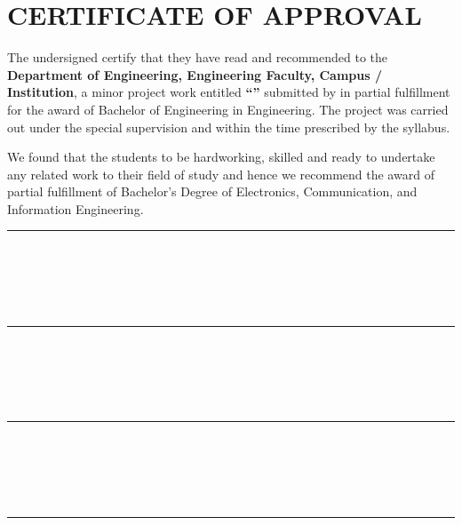 \chapter*{CERTIFICATE OF APPROVAL}
{}

\noindent The undersigned certify that they have read and recommended to the
\textbf{Department of Engineering, Engineering Faculty, Campus / Institution},
a minor project work entitled \textbf{``\cTitle''} submitted by
\textbf{\authorList} in partial fulfillment for the award of Bachelor of
Engineering in Engineering.
The project was carried out under the special supervision and within the time
prescribed by the syllabus.

\vspace{1em}

We found that the students to be hardworking, skilled and ready to undertake
any related work to their field of study and hence we recommend the award of
partial fulfillment of Bachelor's Degree of Electronics, Communication, and
Information Engineering.

\vspace{2em}

\noindent
\begin{minipage}[t]{0.48\textwidth}
    \rule{6cm}{0.2mm} \\
    \cSupervisorTitle \\
    \cSupervisor \\
    \cSupervisorDept \\
    \cSupervisorAddress
\end{minipage}
\hfill
\begin{minipage}[t]{0.48\textwidth}
    \rule{6cm}{0.2mm} \\
    \cExternalExaminerTitle \\
    \cExternalExaminer \\
    \cExternalExaminerDept \\
    \cExternalExaminerAddress
\end{minipage}

\vspace{3em}

\noindent
\begin{minipage}[t]{0.48\textwidth}
    \rule{6cm}{0.2mm} \\
    \cProjectCoordinatorTitle \\
    \cProjectCoordinator \\
    \cProjectCoordinatorDept \\
    \cProjectCoordinatorAddress
\end{minipage}
\hfill
\begin{minipage}[t]{0.48\textwidth}
    \rule{6cm}{0.2mm} \\
    \cHODTitle \\
    \cHOD \\
    \cHODDept \\
    \cHODAddress
\end{minipage}

\vspace{2em}

\noindent\cDate

